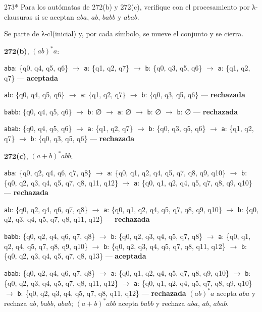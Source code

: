 \documentclass[11pt]{article}
\begin{document}
\begin{ejercicio}{273}{*}
Para los autómatas de 272(b) y 272(c), verifique con el procesamiento por λ-clausuras si se aceptan $aba$, $ab$, $babb$ y $abab$.
\end{ejercicio}
\proc Se parte de λ-cl(inicial) y, por cada símbolo, se mueve el conjunto y se cierra.\par\textbf{272(b)}, $(ab)^*a$:\par \texttt{aba}: \{q0, q4, q5, q6\} $\to$ \texttt{a}: \{q1, q2, q7\} $\to$ \texttt{b}: \{q0, q3, q5, q6\} $\to$ \texttt{a}: \{q1, q2, q7\} — \textbf{aceptada}\par \texttt{ab}: \{q0, q4, q5, q6\} $\to$ \texttt{a}: \{q1, q2, q7\} $\to$ \texttt{b}: \{q0, q3, q5, q6\} — \textbf{rechazada}\par \texttt{babb}: \{q0, q4, q5, q6\} $\to$ \texttt{b}: ∅ $\to$ \texttt{a}: ∅ $\to$ \texttt{b}: ∅ $\to$ \texttt{b}: ∅ — \textbf{rechazada}\par \texttt{abab}: \{q0, q4, q5, q6\} $\to$ \texttt{a}: \{q1, q2, q7\} $\to$ \texttt{b}: \{q0, q3, q5, q6\} $\to$ \texttt{a}: \{q1, q2, q7\} $\to$ \texttt{b}: \{q0, q3, q5, q6\} — \textbf{rechazada}\par\textbf{272(c)}, $(a + b)^*abb$:\par \texttt{aba}: \{q0, q2, q4, q6, q7, q8\} $\to$ \texttt{a}: \{q0, q1, q2, q4, q5, q7, q8, q9, q10\} $\to$ \texttt{b}: \{q0, q2, q3, q4, q5, q7, q8, q11, q12\} $\to$ \texttt{a}: \{q0, q1, q2, q4, q5, q7, q8, q9, q10\} — \textbf{rechazada}\par \texttt{ab}: \{q0, q2, q4, q6, q7, q8\} $\to$ \texttt{a}: \{q0, q1, q2, q4, q5, q7, q8, q9, q10\} $\to$ \texttt{b}: \{q0, q2, q3, q4, q5, q7, q8, q11, q12\} — \textbf{rechazada}\par \texttt{babb}: \{q0, q2, q4, q6, q7, q8\} $\to$ \texttt{b}: \{q0, q2, q3, q4, q5, q7, q8\} $\to$ \texttt{a}: \{q0, q1, q2, q4, q5, q7, q8, q9, q10\} $\to$ \texttt{b}: \{q0, q2, q3, q4, q5, q7, q8, q11, q12\} $\to$ \texttt{b}: \{q0, q2, q3, q4, q5, q7, q8, q13\} — \textbf{aceptada}\par \texttt{abab}: \{q0, q2, q4, q6, q7, q8\} $\to$ \texttt{a}: \{q0, q1, q2, q4, q5, q7, q8, q9, q10\} $\to$ \texttt{b}: \{q0, q2, q3, q4, q5, q7, q8, q11, q12\} $\to$ \texttt{a}: \{q0, q1, q2, q4, q5, q7, q8, q9, q10\} $\to$ \texttt{b}: \{q0, q2, q3, q4, q5, q7, q8, q11, q12\} — \textbf{rechazada}
\resp $(ab)^*a$ acepta $aba$ y rechaza $ab$, $babb$, $abab$; $(a + b)^*abb$ acepta $babb$ y rechaza $aba$, $ab$, $abab$.
\end{document}
